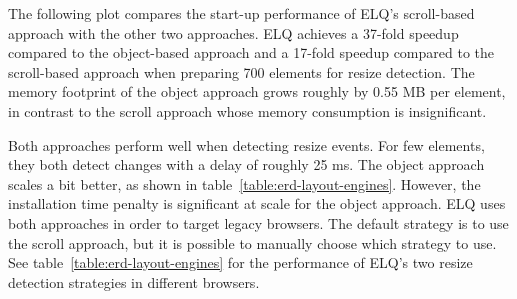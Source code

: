 \documentclass[sigconf,9pt]{acmart}
\newcommand{\elq}{ELQ}
\begin{document}
    The following plot compares the start-up performance
    of \elq{}'s scroll-based approach with the other two approaches.
    \elq{} achieves a 37-fold speedup compared to the object-based
    approach and a 17-fold speedup compared to the scroll-based
    approach when preparing 700 elements for resize detection.
    The memory footprint of the object approach grows roughly by 0.55 MB per element, in contrast to the scroll approach whose memory consumption is insignificant.

    Both approaches perform well when detecting resize events. For few elements, they both detect changes with a delay of roughly 25 ms.
    The object approach scales a bit better, as shown in table~\ref{table:erd-layout-engines}. However, the installation time penalty is significant at scale for the object approach.
    \elq{} uses both approaches in order to target legacy browsers. The default strategy is to use the scroll approach, but it is possible to manually choose which strategy to use.
    See table~\ref{table:erd-layout-engines} for the performance of \elq{}'s two resize detection strategies in different browsers.
\end{document}
